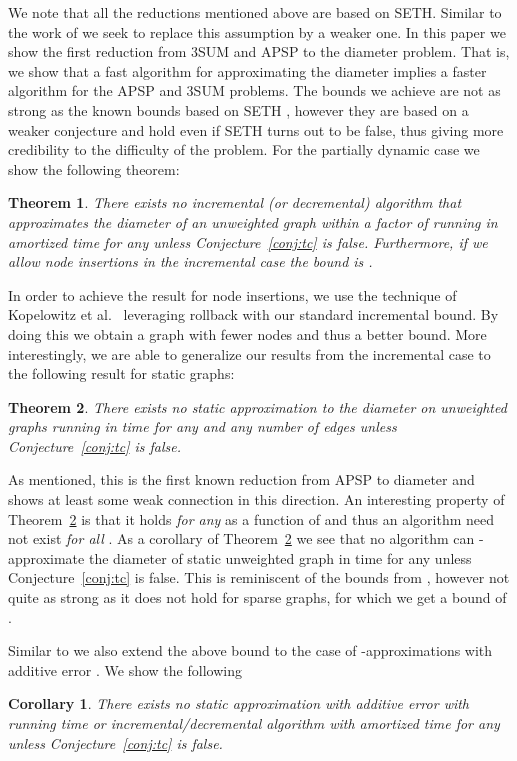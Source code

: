 \documentclass[a4paper,11pt]{article}
\newtheorem{theorem}{Theorem}
\newtheorem{corollary}{Corollary}
\theoremstyle{definition}
\begin{document}
We note that all the reductions mentioned above are based on SETH. Similar to
the work of \cite{AbboudVY15,AbboudHVW16} we seek to replace this assumption by
a weaker one. In this paper we show the first reduction from 3SUM and APSP to
the diameter problem. That is, we show that a fast algorithm for approximating
the diameter implies a faster algorithm for the APSP and 3SUM
problems. The bounds we achieve are not as strong as the known bounds based on
SETH \cite{RodittyW13,ChechikLRSTW14,CairoGR16}, however they are based on a
weaker conjecture and hold even if SETH turns out to be false, thus giving more
credibility to the difficulty of the problem. For the partially dynamic case we
show the following theorem:
\begin{theorem}\label{thm:dyn_diam}
    There exists no incremental (or decremental) algorithm that approximates
    the diameter of an unweighted graph within a factor of  running
    in amortized time  for any  unless
    Conjecture~\ref{conj:tc} is false. Furthermore, if we allow node insertions
    in the incremental case the bound is .
\end{theorem}
In order to achieve the result for node insertions, we use the technique of
Kopelowitz et al.~\cite{KopelowitzPP16} leveraging rollback with our standard
incremental bound. By doing this we obtain a graph with fewer nodes
and thus a better bound.
More interestingly, we are able to generalize our results from the incremental
case to the following result for static graphs:
\begin{theorem}\label{thm:sta_diam}
    There exists no static  approximation to the diameter on
    unweighted graphs running in  time for
    any  and any number of edges  unless
    Conjecture~\ref{conj:tc} is false.
\end{theorem}
As mentioned, this is the first known reduction from APSP to diameter and shows
at least some weak connection in this direction. An interesting property of
Theorem~\ref{thm:sta_diam} is that it holds \emph{for any}  as a function of
 and thus an algorithm need not exist \emph{for all} .
As a corollary of Theorem~\ref{thm:sta_diam} we see that no algorithm can
-approximate the diameter of static unweighted graph in time
 for any  unless Conjecture~\ref{conj:tc} is false.
This is reminiscent of the bounds from
\cite{RodittyW13,ChechikLRSTW14,CairoGR16}, however not quite as strong as it
does not hold for sparse graphs, for which we get a bound of .

Similar to \cite{ChechikLRSTW14,CairoGR16} we also extend the above bound to
the case of -approximations with additive error . We
show the following
\begin{corollary}\label{cor:diam_add}
    There exists no static  approximation with additive error
     with running time  or
    incremental/decremental algorithm with amortized time  for any  unless
    Conjecture~\ref{conj:tc} is false.
\end{corollary}
\end{document}
